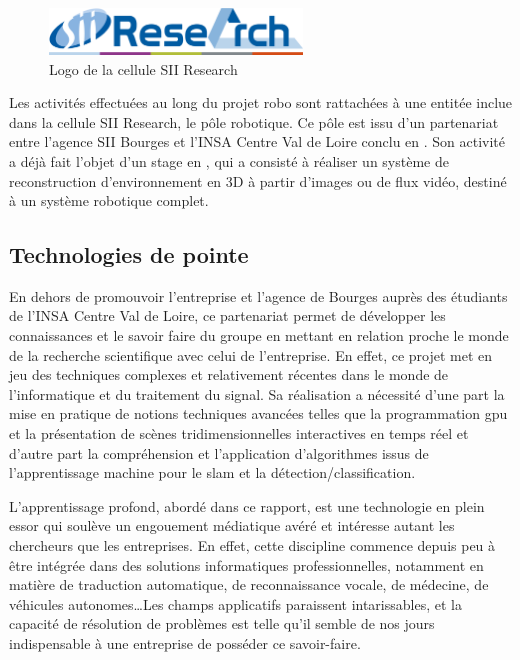 {{				\begin{figure}[h]
				{
					\centering
					\includegraphics[page=1,width=0.6\textwidth]{figures/siiresearch.png}
					\caption{Logo de la cellule SII Research}
					\label{fig:sii_research}
				}
				\end{figure}
			}
			\par
			{
				Les activités effectuées au long du projet \gls{robo} sont rattachées à une entitée inclue dans la cellule SII Research, le pôle robotique. Ce pôle est issu d'un partenariat entre l'agence SII Bourges et l'INSA Centre Val de Loire conclu en . Son activité a déjà fait l'objet d'un stage en , qui a consisté à réaliser un système de reconstruction d'environnement en 3D à partir d'images ou de flux vidéo\cite{qr3d}, destiné à un système robotique complet.
			}
			
		\subsection{Technologies de pointe}
		
			\par
			{
				En dehors de promouvoir l'entreprise et l'agence de Bourges auprès des étudiants de l'INSA Centre Val de Loire, ce partenariat permet de développer les connaissances et le savoir faire du groupe en mettant en relation proche le monde de la recherche scientifique avec celui de l'entreprise. En effet, ce projet met en jeu des techniques complexes et relativement récentes dans le monde de l'informatique et du traitement du signal. Sa réalisation a nécessité d'une part la mise en pratique de notions techniques avancées telles que la programmation \gls{gpu} et la présentation de scènes tridimensionnelles interactives en temps réel et d'autre part la compréhension et l'application d'algorithmes issus de l'apprentissage machine pour le \gls{slam} et la détection/classification.
			}
			\par
			{
				L'apprentissage profond, abordé dans ce rapport, est une technologie en plein essor qui soulève un engouement médiatique avéré et intéresse autant les chercheurs que les entreprises. En effet, cette discipline commence depuis peu à être intégrée dans des solutions informatiques professionnelles, notamment en matière de traduction automatique\cite{dltra}, de reconnaissance vocale\cite{dlrec}, de médecine\cite{dlmed}, de véhicules autonomes\cite{dlaut}\ldots \newline Les champs applicatifs paraissent intarissables, et la capacité de résolution de problèmes est telle qu'il semble de nos jours indispensable à une entreprise de posséder ce savoir-faire.
			}
}
